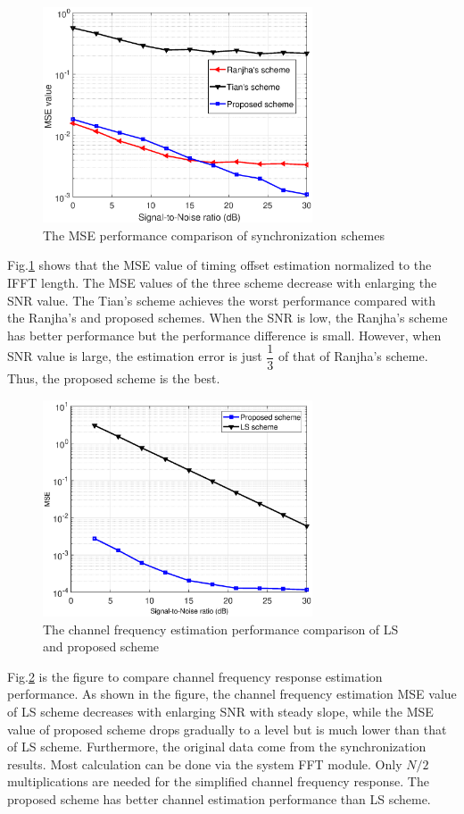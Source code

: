 \documentclass[journal]{IEEEtran}
\begin{document}
	\begin{figure}[!htb]
    	\centering \includegraphics[width=8cm]{synchronization_mse.eps}
		\caption{The MSE performance comparison of synchronization schemes} \label{fig:synchronization_mse}
    \end{figure}
    Fig.\ref{fig:synchronization_mse} shows that the MSE value of timing offset estimation normalized to the IFFT length. The MSE values of the three scheme decrease with enlarging the SNR value. The Tian's scheme \cite{Tian2008} achieves the worst performance compared with the Ranjha's \cite{Ranjha2015} and proposed schemes. When the SNR is low, the Ranjha's scheme has better performance but the performance difference is small. However, when SNR value is large, the estimation error is just $ \dfrac{1}{3} $ of that of Ranjha's scheme.
    Thus, the proposed scheme is the best.

    \begin{figure}[!htb]
    	\centering \includegraphics[width=8cm]{channel_estimation_HMSE.eps}
		\caption{The channel frequency estimation performance comparison of LS and proposed scheme} \label{fig:channel_estimation_HMSE}
    \end{figure}
    Fig.\ref{fig:channel_estimation_HMSE} is the figure to compare channel frequency response estimation performance. As shown in the figure, the channel frequency estimation MSE value of LS scheme decreases with enlarging SNR with steady slope, while the MSE value of proposed scheme drops gradually to a level but is much lower than that of LS scheme. Furthermore, the original data come from the synchronization results. Most calculation can be done via the system FFT module. Only $ N/2 $ multiplications are needed for the simplified channel frequency response. The proposed scheme has better channel estimation performance than LS scheme.
\end{document}
